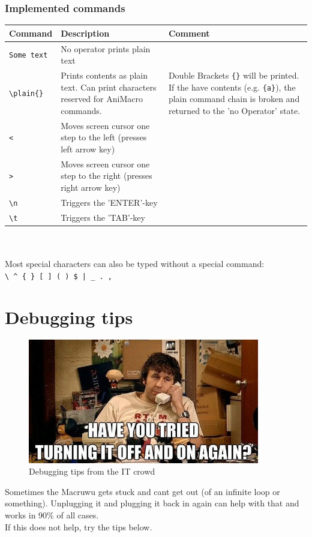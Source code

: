 \documentclass[english, 12pt]{scrartcl}
\begin{document}
	\subsubsection{Implemented commands}
	\begin{tabular}{|l|m{6.5cm}|m{6.5cm}}
		\hline
		\textbf{Command} & \textbf{Description} & \textbf{Comment}\\
		\hline
		\hline
		\verb=Some text= & No operator prints plain text& \\
		\hline
		\verb=\plain{}= & Prints contents as plain text. Can print characters reserved for AniMacro commands. & Double Brackets \verb={}= will be printed. If the have contents (e.g. \verb={a}=), the plain command chain is broken and returned to the 'no Operator' state.\\
		\hline 
		\verb=<= & Moves screen cursor one step to the left (presses left arrow key) & \\
		\verb=>= & Moves screen cursor one step to the right (presses right arrow key) & \\
		\verb=\n= & Triggers the 'ENTER'-key & \\
		\verb=\t= & Triggers the 'TAB'-key & \\
		\hline
	\end{tabular}\\\\
	Most special characters can also be typed without a special command:\\
	\verb=\ ^ { } [ ] ( ) $ | _ . ,=
	\section{Debugging tips}
	\begin{figure}[H]
		\centering
		\includegraphics[width=0.9\textwidth]{debugging}
		\caption{Debugging tips from the IT crowd}
	\end{figure}
	Sometimes the Macruwu gets stuck and cant get out (of an infinite loop or something). Unplugging it and plugging it back in again can help with that and works in 90\% of all cases.\\
	If this does not help, try the tips below.
\end{document}
